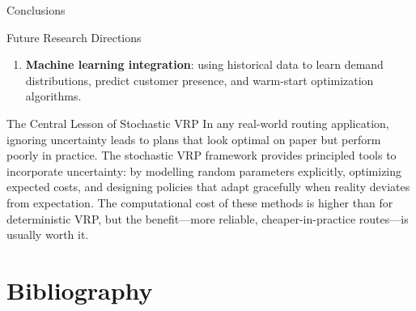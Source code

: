 \documentclass[aspectratio=169,10pt]{beamer}
\begin{document}
\begin{frame}[allowframebreaks]{Conclusions}
\begin{block}{Future Research Directions}
\begin{enumerate}
      \item \textbf{Machine learning integration}: using historical data
            to learn demand distributions, predict customer presence,
            and warm-start optimization algorithms.
    \end{enumerate}
  \end{block}

  \framebreak

  \begin{alertblock}{The Central Lesson of Stochastic VRP}
    In any real-world routing application, ignoring uncertainty leads to
    plans that look optimal on paper but perform poorly in practice.
    The stochastic VRP framework provides principled tools to incorporate
    uncertainty: by modelling random parameters explicitly, optimizing
    expected costs, and designing policies that adapt gracefully when
    reality deviates from expectation.
    The computational cost of these methods is higher than for
    deterministic VRP, but the benefit---more reliable, cheaper-in-practice
    routes---is usually worth it.
  \end{alertblock}

\end{frame}

\section{Bibliography}
\end{document}
